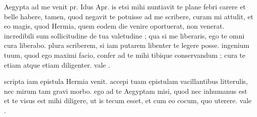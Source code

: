 


 Aegypta ad me venit pr. Idus Apr. is etsi mihi nuntiavit te plane febri carere et belle habere, tamen, quod negavit te potuisse ad me scribere, curam mi attulit, et eo magis, quod Hermia, quem eodem die venire oportuerat, non venerat. incredibili sum sollicitudine de tua valetudine ; qua si me liberaris, ego te omni cura liberabo. plura scriberem, si iam putarem libenter te legere posse. ingenium tuum, quod ego maximi facio, confer ad te mihi tibique conservandum ; cura te etiam atque etiam diligenter. vale .

 scripta iam epistula Hermia venit. accepi tuam epistulam vacillantibus litterulis, nec mirum tam gravi morbo. ego ad te Aegyptam misi, quod nec inhumanus est et te visus est mihi diligere, ut is tecum esset, et cum eo cocum, quo uterere. vale .
